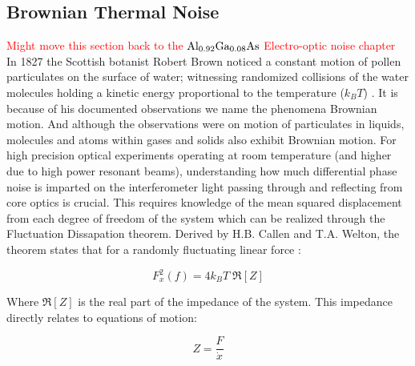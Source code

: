 \subsection{Brownian Thermal Noise}
\textcolor{red}{Might move this section back to the $\mathrm{Al_{0.92}Ga_{0.08}As}$ Electro-optic noise chapter}
\\
In 1827 the Scottish botanist Robert Brown noticed a constant motion of pollen particulates on the surface of water; witnessing randomized collisions of the water molecules holding a kinetic energy proportional to the temperature ($k_BT$) \cite{Brown:1828}. It is because of his documented observations we name the phenomena Brownian motion. And although the observations were on motion of particulates in liquids, molecules and atoms within gases and solids also exhibit Brownian motion. For high precision optical experiments operating at room temperature (and higher due to high power resonant beams), understanding how much differential phase noise is imparted on the interferometer light passing through and reflecting from core optics is crucial. This requires knowledge of the mean squared displacement from each degree of freedom of the system which can be realized through the Fluctuation Dissapation theorem. Derived by H.B. Callen and T.A. Welton, the theorem states that for a randomly fluctuating linear force \cite{Callen:1951}:




\begin{equation}
F_x^2(f) = 4 k_B T\; \Re[Z]
\end{equation}

 \noindent Where $\Re[Z]$ is the real part of the impedance of the system. This impedance directly relates to equations of motion:

 \begin{equation}
 Z = \frac{F}{\dot{x}}
 \end{equation}

